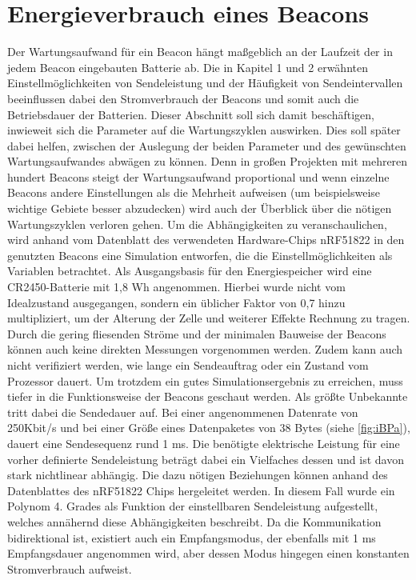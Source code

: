 \section{Energieverbrauch eines Beacons} 
Der Wartungsaufwand für ein Beacon hängt maßgeblich an der Laufzeit der in jedem Beacon eingebauten Batterie ab. Die in Kapitel 1 und 2 erwähnten Einstellmöglichkeiten von Sendeleistung und der Häufigkeit von Sendeintervallen beeinflussen dabei den Stromverbrauch der Beacons und somit auch die Betriebsdauer der Batterien. Dieser Abschnitt soll sich damit beschäftigen, inwieweit sich die Parameter auf die Wartungszyklen auswirken. Dies soll später dabei helfen, zwischen der Auslegung der beiden Parameter und des gewünschten Wartungsaufwandes abwägen zu können. Denn in großen Projekten mit mehreren hundert Beacons steigt der Wartungsaufwand proportional und wenn einzelne Beacons andere Einstellungen als die Mehrheit aufweisen (um beispielsweise wichtige Gebiete besser abzudecken) wird auch der Überblick über die nötigen Wartungszyklen verloren gehen. Um die Abhängigkeiten zu veranschaulichen, wird anhand vom Datenblatt des verwendeten Hardware-Chips nRF51822\cite{nRF5} in den genutzten Beacons eine Simulation entworfen, die die Einstellmöglichkeiten als Variablen betrachtet. Als Ausgangsbasis für den Energiespeicher wird eine CR2450-Batterie mit 1,8 Wh\cite{CR2450} angenommen. Hierbei wurde nicht vom Idealzustand ausgegangen, sondern ein üblicher Faktor von 0,7 hinzu multipliziert, um der Alterung der Zelle und weiterer Effekte Rechnung zu tragen. Durch die gering fliesenden Ströme und der minimalen Bauweise der Beacons können auch keine direkten Messungen vorgenommen werden. Zudem kann auch nicht verifiziert werden, wie lange ein Sendeauftrag oder ein Zustand vom Prozessor dauert. Um trotzdem ein gutes Simulationsergebnis zu erreichen, muss tiefer in die Funktionsweise der Beacons geschaut werden. Als größte Unbekannte tritt dabei die Sendedauer auf. Bei einer angenommenen Datenrate von 250Kbit/s und bei einer Größe eines Datenpaketes von 38 Bytes \cite{iBPa} (siehe \ref{fig:iBPa}), dauert eine Sendesequenz rund 1 ms. Die benötigte elektrische Leistung für eine vorher definierte Sendeleistung beträgt dabei ein Vielfaches dessen und ist davon stark nichtlinear abhängig. Die dazu nötigen Beziehungen können anhand des Datenblattes des nRF51822 Chips hergeleitet werden. In diesem Fall wurde ein Polynom 4. Grades als Funktion der einstellbaren Sendeleistung aufgestellt, welches annähernd diese Abhängigkeiten beschreibt. Da die Kommunikation bidirektional ist, existiert auch ein Empfangsmodus, der ebenfalls mit 1 ms Empfangsdauer angenommen wird, aber dessen Modus hingegen einen konstanten Stromverbrauch aufweist.
